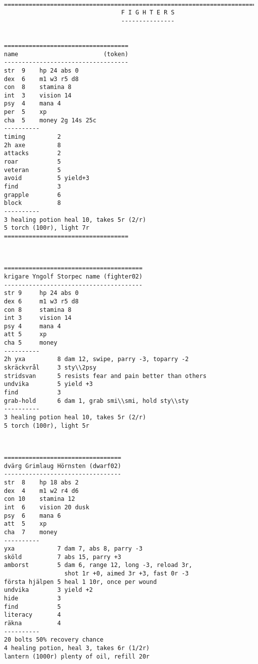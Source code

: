 \

\pagebreak[1]
\tiny \begin{samepage} \begin{verbatim}
================================================================================
                                 F I G H T E R S
                                 ---------------


===================================
name                        (token)
-----------------------------------
str  9    hp 24 abs 0
dex  6    m1 w3 r5 d8
con  8    stamina 8
int  3    vision 14
psy  4    mana 4
per  5    xp
cha  5    money 2g 14s 25c
----------
timing         2
2h axe         8
attacks        2
roar           5
veteran        5
avoid          5 yield+3
find           3
grapple        6
block          8
----------
3 healing potion heal 10, takes 5r (2/r)
5 torch (100r), light 7r
===================================
\end{verbatim} \end{samepage} \normalsize


\

\pagebreak[1]
\tiny \begin{samepage} \begin{verbatim}
=======================================
krigare Yngolf Storpec name (fighter02)
---------------------------------------
str 9     hp 24 abs 0
dex 6     m1 w3 r5 d8
con 8     stamina 8
int 3     vision 14
psy 4     mana 4
att 5     xp
cha 5     money
----------
2h yxa         8 dam 12, swipe, parry -3, toparry -2
skräckvrål     3 sty\\2psy
stridsvan      5 resists fear and pain better than others
undvika        5 yield +3
find           3
grab-hold      6 dam 1, grab smi\\smi, hold sty\\sty
----------
3 healing potion heal 10, takes 5r (2/r)
5 torch (100r), light 5r
\end{verbatim} \end{samepage} \normalsize


\

\pagebreak[1]
\tiny \begin{samepage} \begin{verbatim}
=================================
dvärg Grimlaug Hörnsten (dwarf02)
---------------------------------
str  8    hp 18 abs 2
dex  4    m1 w2 r4 d6
con 10    stamina 12
int  6    vision 20 dusk
psy  6    mana 6
att  5    xp
cha  7    money
----------
yxa            7 dam 7, abs 8, parry -3
sköld          7 abs 15, parry +3
amborst        5 dam 6, range 12, long -3, reload 3r,
                 shot 1r +0, aimed 3r +3, fast 0r -3
första hjälpen 5 heal 1 10r, once per wound
undvika        3 yield +2
hide           3
find           5
literacy       4
räkna          4
----------
20 bolts 50% recovery chance
4 healing potion, heal 3, takes 6r (1/2r)
lantern (1000r) plenty of oil, refill 20r
\end{verbatim} \end{samepage} \normalsize


